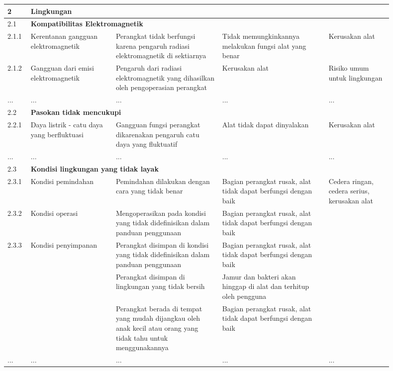\documentclass[11pt,a4paper,twoside,onecolumn]{book}
\begin{document}
\begin{longtable}{p{0.05\linewidth} p{0.20\linewidth} p{0.25\linewidth} p{0.25\linewidth} p{0.15\linewidth}}
				\hline
				\hline
				\hline
				\cellcolor{cyan}2 & \multicolumn{4}{l}{\textbf{Lingkungan} \cellcolor{cyan}} \\
				\hline
				2.1 & \multicolumn{4}{l}{\textbf{Kompatibilitas Elektromagnetik}} \\
				\hline
				2.1.1 & Kerentanan gangguan elektromagnetik & Perangkat tidak berfungsi karena pengaruh radiasi elektromagnetik di sektiarnya & Tidak memungkinkannya melakukan fungsi alat yang benar & Kerusakan alat \\
				\hline
				2.1.2 & Gangguan dari emisi elektromagnetik & Pengaruh   dari radiasi elektromagnetik yang dihasilkan oleh pengoperasian perangkat & Kerusakan alat  & Risiko umum untuk 
				lingkungan \\ \cline{1-5}
				\hline
				... & ... & ... & ... & ... \\ \cline{1-5}
				\hline
				\hline
				2.2 & \multicolumn{4}{l}{\textbf{Pasokan tidak mencukupi}} \\
				\hline
				2.2.1 & Daya listrik - catu daya yang berfluktuasi & Gangguan fungsi perangkat dikarenakan 
				pengaruh catu daya yang fluktuatif & Alat tidak dapat dinyalakan & Kerusakan alat  \\
				\hline
				... & ... & ... & ... & ... \\ \cline{1-5}
				\hline
				\hline
				2.3 & \multicolumn{4}{l}{\textbf{Kondisi lingkungan yang tidak layak}} \\
				\hline
				2.3.1 & Kondisi pemindahan & Pemindahan dilakukan dengan cara yang tidak benar  & Bagian perangkat rusak, alat tidak dapat berfungsi dengan baik  & \multirow{5}{\linewidth}{Cedera ringan, cedera serius, kerusakan alat} \\
				\cline{1-4}
				2.3.2 & Kondisi operasi & Mengoperasikan pada kondisi yang tidak didefinisikan dalam panduan penggunaan  & Bagian perangkat rusak, alat tidak dapat berfungsi dengan baik  &  \\
				\cline{1-4}
				2.3.3 & Kondisi penyimpanan & Perangkat disimpan di kondisi yang tidak didefinisikan dalam panduan penggunaan  & Bagian perangkat rusak, alat tidak dapat berfungsi dengan baik &  \\
				\cline{3-4}						
				 & & Perangkat disimpan di lingkungan yang tidak bersih  & Jamur dan bakteri akan hinggap di alat dan terhitup oleh pengguna  &  \\
				 \cline{3-4}
				 & & Perangkat berada di tempat yang mudah dijangkau oleh anak kecil atau orang yang tidak tahu untuk menggunakannya & Bagian perangkat rusak, alat tidak dapat berfungsi dengan baik  &  \\ \cline{1-5}
				 ... & ... & ... & ... & ... \\ \cline{1-5}
				 \hline
				

\end{longtable}
\end{document}
